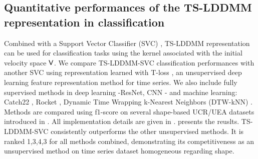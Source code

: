 \subsection{Quantitative performances of the TS-LDDMM representation in classification}
Combined with a Support Vector Classifier (SVC) \cite{hsu2003practical}, TS-LDDMM representation can be used for 
classification tasks using the kernel associated with the initial velocity space $\mathsf{V}$.
We compare TS-LDDMM-SVC classification performances with another SVC using representation 
learned with T-loss \cite{franceschi2019unsupervised}, an unsupervised deep learning feature 
representation method for time series. We also include fully supervised methods in deep learning 
-ResNet, CNN \cite{ismail2019deep}- and machine learning: Catch22 \cite{lubba2019catch22}, Rocket
\cite{dempster2020rocket}, Dynamic Time Wrapping k-Nearest Neighbors (DTW-kNN) 
\cite{muller2007dynamic}. Methods are compared using f1-score on several shape-based UCR/UEA datasets 
\cite{dau2019ucr,bagnall2018uea} introduced in . All implementation details are given 
in .
 presents the reuslts. TS-LDDMM-SVC consistently outperforms the other unsupervised methods. It is ranked 1,3,4,3 for all methods combined, 
demonstrating its competitiveness as an unsupervised method on time series dataset homogeneous regarding shape.



